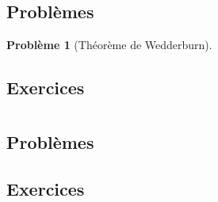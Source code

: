 \documentclass[french]{book}
\theoremstyle{definition}
\newtheorem{pro}{Problème}[chapter]
\begin{document}
\section{Problèmes}

\begin{pro}[Théorème de Wedderburn]
	
\end{pro}

\section{Exercices}


\chapter{}

\section{Problèmes}

\section{Exercices}
\end{document}
